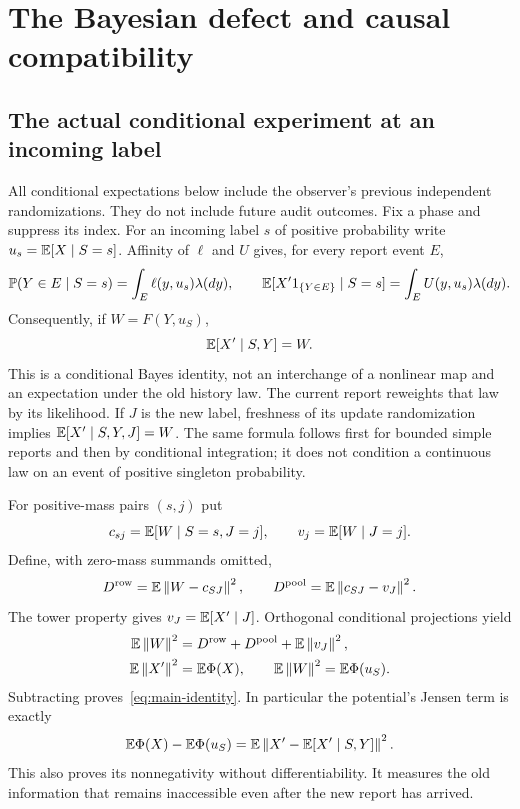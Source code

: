 \section{The Bayesian defect and causal compatibility}\label{sec:defect}
\subsection{The actual conditional experiment at an incoming label}
All conditional expectations below include the observer's previous independent randomizations. They do not include future audit outcomes. Fix a phase and suppress its index. For an incoming label $s$ of positive probability write $u_s=\mathbb E[X\mid S=s]$. Affinity of $\ell$ and $U$ gives, for every report event $E$,
\[
 \mathbb P(Y\in E\mid S=s)=\int_E\ell(y,u_s)\lambda(dy),\qquad
 \mathbb E[X'1_{\{Y\in E\}}\mid S=s]=\int_EU(y,u_s)\lambda(dy).
\]
Consequently, if $W=F(Y,u_S)$,
\begin{equation}\label{eq:bayes-barycenter}
 \mathbb E[X'\mid S,Y]=W.
\end{equation}
This is a conditional Bayes identity, not an interchange of a nonlinear map and an expectation under the old history law. The current report reweights that law by its likelihood. If $J$ is the new label, freshness of its update randomization implies
$\mathbb E[X'\mid S,Y,J]=W$. The same formula follows first for bounded simple reports and then by conditional integration; it does not condition a continuous law on an event of positive singleton probability.

For positive-mass pairs $(s,j)$ put
\[
 c_{sj}=\mathbb E[W\mid S=s,J=j],\qquad v_j=\mathbb E[W\mid J=j].
\]
Define, with zero-mass summands omitted,
\begin{equation}\label{eq:defects}
 D^{\rm row}=\mathbb E\left\lVert W-c_{SJ}\right\rVert^2,\qquad
 D^{\rm pool}=\mathbb E\left\lVert c_{SJ}-v_J\right\rVert^2.
\end{equation}
The tower property gives $v_J=\mathbb E[X'\mid J]$. Orthogonal conditional projections yield
\begin{align}
 \mathbb E\left\lVert W\right\rVert^2&=D^{\rm row}+D^{\rm pool}+\mathbb E\left\lVert v_J\right\rVert^2,\label{eq:two-projections}\\
 \mathbb E\left\lVert X'\right\rVert^2&=\mathbb E\Phi(X),\qquad
 \mathbb E\left\lVert W\right\rVert^2=\mathbb E\Phi(u_S).\label{eq:potential-moments}
\end{align}
Subtracting proves~\eqref{eq:main-identity}. In particular the potential's Jensen term is exactly
\begin{equation}\label{eq:residual-identity}
 \mathbb E\Phi(X)-\mathbb E\Phi(u_S)=\mathbb E\left\lVert X'-\mathbb E[X'\mid S,Y]\right\rVert^2.
\end{equation}
This also proves its nonnegativity without differentiability. It measures the old information that remains inaccessible even after the new report has arrived.

